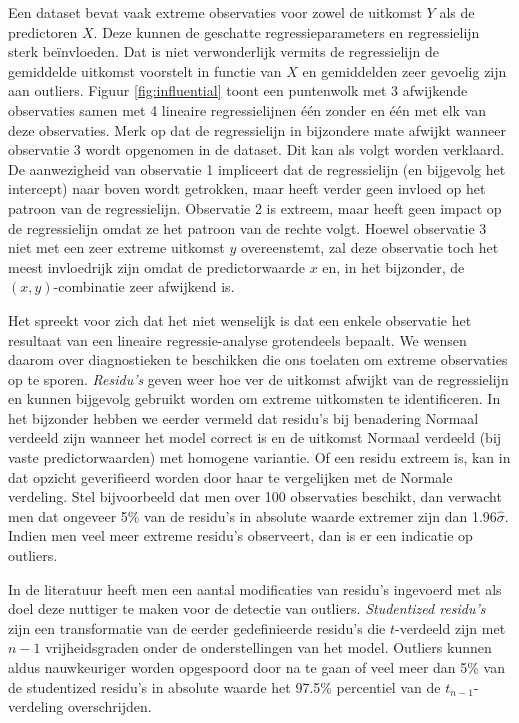 \documentclass[
  12pt,dutch,coursenotes]{book}
\begin{document}
Een dataset bevat vaak extreme observaties voor zowel de uitkomst \(Y\) als de predictoren \(X\). Deze kunnen de geschatte regressieparameters en regressielijn sterk beïnvloeden. Dat is niet verwonderlijk vermits de regressielijn de gemiddelde uitkomst voorstelt in functie van \(X\) en gemiddelden zeer gevoelig zijn aan outliers. Figuur \ref{fig:influential} toont een puntenwolk met 3 afwijkende observaties samen met 4 lineaire regressielijnen één zonder en één met elk van deze observaties. Merk op dat de regressielijn in bijzondere mate afwijkt wanneer observatie 3 wordt opgenomen in de dataset. Dit kan als volgt worden verklaard. De aanwezigheid van observatie 1 impliceert dat de regressielijn (en bijgevolg het intercept) naar boven wordt getrokken, maar heeft verder geen invloed op het patroon van de regressielijn. Observatie 2 is extreem, maar heeft geen impact op de regressielijn omdat ze het patroon van de rechte volgt. Hoewel observatie 3 niet met een zeer extreme uitkomst \(y\) overeenstemt, zal deze observatie toch het meest invloedrijk zijn omdat de predictorwaarde \(x\) en, in het bijzonder, de \((x,y)\)-combinatie zeer afwijkend is.

Het spreekt voor zich dat het niet wenselijk is dat een enkele observatie het resultaat van een lineaire regressie-analyse grotendeels bepaalt. We wensen daarom over diagnostieken te beschikken die ons toelaten om extreme observaties op te sporen. \emph{Residu's} geven weer hoe ver de uitkomst afwijkt van de regressielijn en kunnen bijgevolg gebruikt worden om extreme uitkomsten te identificeren. In het bijzonder hebben we eerder vermeld dat residu's bij benadering Normaal verdeeld zijn wanneer het model correct is en de uitkomst Normaal verdeeld (bij vaste predictorwaarden) met homogene variantie. Of een residu extreem is, kan in dat opzicht geverifieerd worden door haar te vergelijken met de Normale verdeling. Stel bijvoorbeeld dat men over 100 observaties beschikt, dan verwacht men dat ongeveer 5\% van de residu's in absolute waarde extremer zijn dan 1.96\(\hat{\sigma}\). Indien men veel meer extreme residu's observeert, dan is er een indicatie op outliers.

In de literatuur heeft men een aantal modificaties van residu's ingevoerd met als doel deze nuttiger te maken voor de detectie van outliers. \emph{Studentized residu's} zijn een transformatie van de eerder gedefinieerde residu's die \(t\)-verdeeld zijn met \(n-1\) vrijheidsgraden onder de onderstellingen van het model. Outliers kunnen aldus nauwkeuriger worden opgespoord door na te gaan of veel meer dan 5\% van de studentized residu's in absolute waarde het 97.5\% percentiel van de \(t_{n-1}\)-verdeling overschrijden.
\end{document}
